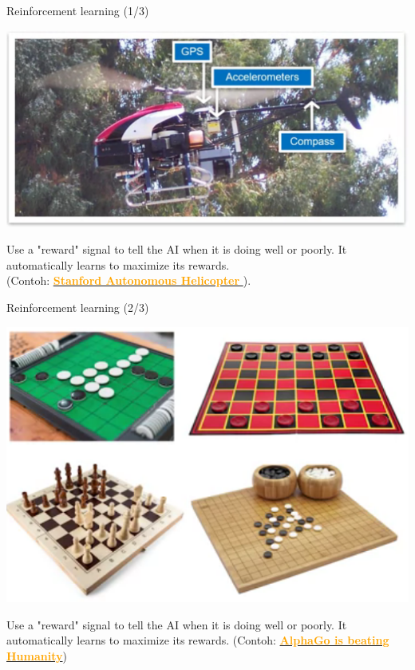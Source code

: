 \documentclass[pdf]{beamer}
\theoremstyle{mystyle}
\begin{document}
\begin{frame}{Reinforcement learning (1/3)}
	\begin{center}
		\includegraphics[scale=.325]{reinforcement-learning}
	\end{center}
	Use a "reward" signal to tell the AI when it is doing well or poorly. It automatically learns to maximize its rewards. \\
	(Contoh: \href{https://drive.google.com/file/d/19Zb2hjhyJ6lEUXo_OHQ0RSLrKSf6188x/view?usp=sharing}{\textcolor {orange} {\textbf{Stanford Autonomous Helicopter}} }).
\end{frame}

\begin{frame}{Reinforcement learning (2/3)}
	\begin{center}
		\includegraphics[scale=.325]{reinforcement-learning-2}
	\end{center}
	Use a "reward" signal to tell the AI when it is doing well or poorly. It automatically learns to maximize its rewards.
	(Contoh: \href{https://drive.google.com/file/d/1Bia4pGf2m1lg9Fd8Suu732Hz471nUg6j/view?usp=sharing}{\textcolor {orange} {\textbf{AlphaGo is beating Humanity}}})
\end{frame}
\end{document}
